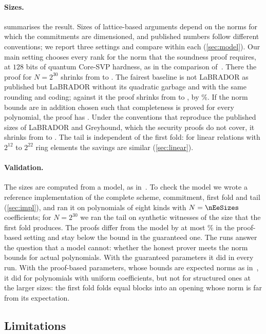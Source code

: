 \paragraph{Sizes.}
 summarises the result. Sizes of lattice-based arguments depend on the norms for which the commitments are dimensioned, and published numbers follow different conventions; we report three settings and compare within each (\cref{sec:model}). Our main setting chooses every rank for the norm that the soundness proof requires, at $128$ bits of quantum Core-SVP hardness, as in the comparison of~\cite{DBK26}. There the proof for $N=2^{30}$ shrinks from \nBQc{} to \nWQc\KB. The fairest baseline is not LaBRADOR as published but LaBRADOR without its quadratic garbage and with the same rounding and coding; against it the proof shrinks from \nSQc{} to \nWQc\KB, by \nPctStrongQ\%. If the norm bounds are in addition chosen such that completeness is proved for every polynomial, the proof has \nGQc\KB. Under the conventions that reproduce the published sizes of LaBRADOR and Greyhound, which the security proofs do not cover, it shrinks from \nBCc{} to \nWCc\KB. The tail is independent of the first fold: for linear relations with $2^{12}$ to $2^{22}$ ring elements the savings are similar (\cref{sec:linear}).

\paragraph{Validation.}
The sizes are computed from a model, as in~\cite{BS23,NS24}. To check the model we wrote a reference implementation of the complete scheme, commitment, first fold and tail (\cref{sec:impl}), and ran it on \nEeRuns{} polynomials of eight kinds with $N=\nEeSizes$ coefficients; for $N=2^{30}$ we ran the tail on synthetic witnesses of the size that the first fold produces. The proofs differ from the model by at most \nEeDevAbs\% in the proof-based setting and stay below the bound in the guaranteed one. The runs answer the question that a model cannot: whether the honest prover meets the norm bounds for actual polynomials. With the guaranteed parameters it did in every run. With the proof-based parameters, whose bounds are expected norms as in~\cite{BS23,NS24}, it did for polynomials with uniform coefficients, but not for structured ones at the larger sizes: the first fold folds equal blocks into an opening whose norm is far from its expectation.

\subsection{Limitations}

